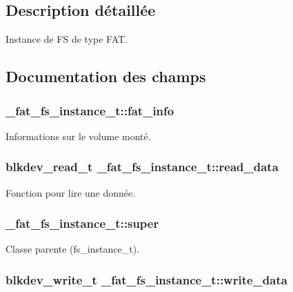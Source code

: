\subsection{Description détaillée}
Instance de F\+S de type F\+A\+T. 

\subsection{Documentation des champs}
\hypertarget{struct__fat__fs__instance__t_acebada58b620f950c9ef3c454db812fc}{
\subsubsection[{fat\+\_\+info}]{ \+\_\+fat\+\_\+fs\+\_\+instance\+\_\+t\+::fat\+\_\+info}}\label{struct__fat__fs__instance__t_acebada58b620f950c9ef3c454db812fc}
Informations sur le volume monté. \hypertarget{struct__fat__fs__instance__t_adfdb319d2d87dc55a678366740a2bba9}{
\subsubsection[{read\+\_\+data}]{\setlength{\rightskip}{0pt plus 5cm}blkdev\+\_\+read\+\_\+t \+\_\+fat\+\_\+fs\+\_\+instance\+\_\+t\+::read\+\_\+data}}\label{struct__fat__fs__instance__t_adfdb319d2d87dc55a678366740a2bba9}
Fonction pour lire une donnée. \hypertarget{struct__fat__fs__instance__t_ac50318180f107a1950961c404ec6fd6d}{
\subsubsection[{super}]{ \+\_\+fat\+\_\+fs\+\_\+instance\+\_\+t\+::super}}\label{struct__fat__fs__instance__t_ac50318180f107a1950961c404ec6fd6d}
Classe parente (fs\+\_\+instance\+\_\+t). \hypertarget{struct__fat__fs__instance__t_a3056aeef9254049e772d6475510b0957}{
\subsubsection[{write\+\_\+data}]{\setlength{\rightskip}{0pt plus 5cm}blkdev\+\_\+write\+\_\+t \+\_\+fat\+\_\+fs\+\_\+instance\+\_\+t\+::write\+\_\+data}}\label{struct__fat__fs__instance__t_a3056aeef9254049e772d6475510b0957}
